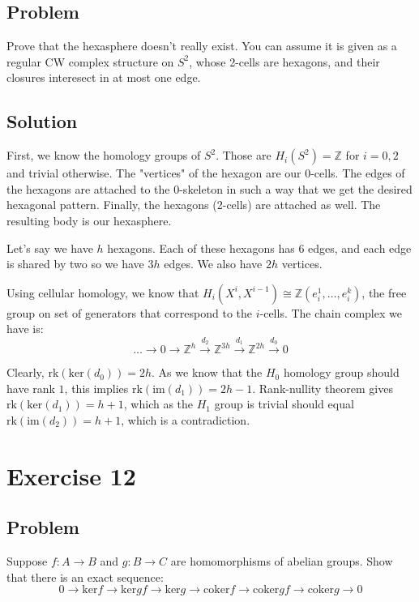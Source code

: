 \documentclass{article}
\begin{document}
\subsection*{Problem}
Prove that the hexasphere doesn't really exist. You can assume it is given as a regular CW complex structure on $S^2$, whose
2-cells are hexagons, and their closures interesect in at most one edge.
\subsection*{Solution}
First, we know the homology groups of $S^2$. Those are $H_i(S^2) = \mathbb{Z}$ for $i=0,2$ and trivial otherwise.
The "vertices" of the hexagon are our $0$-cells.
The edges of the hexagons are attached to the 0-skeleton in such a way that we get the desired hexagonal pattern.
Finally, the hexagons (2-cells) are attached as well. The resulting body is our hexasphere.

Let's say we have $h$ hexagons. Each of these hexagons has 6 edges, and each edge is shared by two so we have $3h$ edges. We also have $2h$ vertices.

Using cellular homology, we know that $H_i(X^i,X^{i-1}) \cong \mathbb{Z}(e_i^1,\dots,e_i^k)$, the free group on set of generators that correspond to the $i$-cells.
The chain complex we have is:
\begin{equation*}
\dots \xrightarrow{} 0 \xrightarrow{} \mathbb{Z}^h \xrightarrow{d_2} \mathbb{Z}^{3h} \xrightarrow{d_1} \mathbb{Z}^{2h} \xrightarrow{d_0} 0
\end{equation*}

Clearly, $\mathrm{rk} (\mathrm{ker}(d_0)) = 2h$. As we know that the $H_0$ homology group should have rank $1$, this implies $\mathrm{rk}(\mathrm{im}(d_1)) = 2h-1$. Rank-nullity theorem gives $\mathrm{rk}(\mathrm{ker}(d_1)) = h+1$, which as the $H_1$ group is trivial should equal $\mathrm{rk}(\mathrm{im}(d_2)) = h+1$, which is a contradiction.


\section*{Exercise 12}
\subsection*{Problem}
Suppose $f: A \to B$ and $g: B \to C$ are homomorphisms of abelian groups.
Show that there is an exact sequence:
\begin{equation*}
0 \to \mathrm{ker}f \to \mathrm{ker}gf \to \mathrm{ker}g \to \mathrm{coker}f \to \mathrm{coker}gf \to \mathrm{coker}g \to 0 
\end{equation*}
\end{document}
